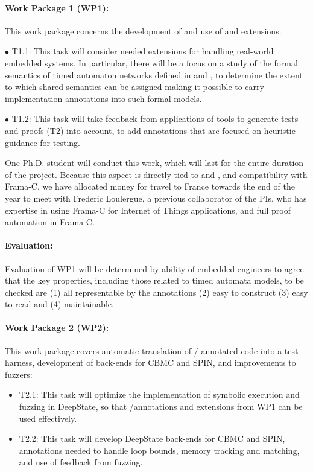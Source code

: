 \paragraph{Work Package 1 (WP1):}  This work package concerns the
development of and use of \acsl and \eacsl extensions.


$\bullet$ T1.1: This task will consider needed extensions for handling
real-world embedded systems.  In particular, there will be a focus on
a study of the formal semantics of timed
automaton networks defined in \uppaal and \prism, to determine the
extent to which shared semantics can be assigned making it possible to
carry implementation annotations into such formal models.

$\bullet$ T1.2: This task will take feedback from applications of
tools to generate tests and proofs (T2) into account, to add annotations
that are focused on heuristic guidance for testing.

One Ph.D. student will conduct this work, which will last for the
entire duration of the project.  Because this aspect is directly tied
to \acsl and \eacsl, and compatibility with Frama-C, we have allocated
money for travel to France towards the end of the year to meet with Frederic Loulergue, a previous
collaborator of the PIs, who has expertise in using Frama-C for 
Internet of Things applications, and full proof automation in Frama-C.

\paragraph{Evaluation:} Evaluation of
WP1 will be determined by ability of embedded engineers to agree that
the key properties, including those related to timed automata models, to be checked are (1) all representable by the
annotations (2) easy to construct (3) easy to read and
(4) maintainable.

\paragraph{Work Package 2 (WP2):}  This work package covers
automatic translation of \acsl/\eacsl-annotated code 
into a \deepstate test harness,
development of back-ends for CBMC and SPIN, and
improvements to fuzzers:
\begin{itemize}[labelsep=3pt,leftmargin=12pt]
\item T2.1: This task will optimize the implementation of symbolic
  execution and fuzzing in DeepState, so that \acsl/\eacsl annotations
  and extensions from WP1 can be used effectively.
\item T2.2: This task will develop DeepState back-ends for CBMC and
  SPIN, annotations needed to handle loop bounds,
  memory tracking and matching, and use of feedback from fuzzing.
\end{itemize}

